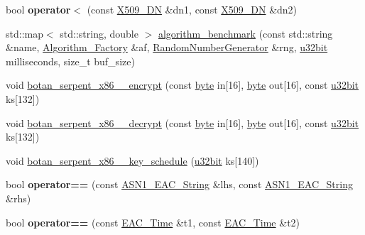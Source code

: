 \begin{DoxyCompactItemize}
\item 
\hypertarget{namespaceBotan_a2d40d6012fc27eb7e7ebbfc8e8042715}{bool {\bfseries operator$<$} (const \hyperlink{classBotan_1_1X509__DN}{X509\-\_\-\-D\-N} \&dn1, const \hyperlink{classBotan_1_1X509__DN}{X509\-\_\-\-D\-N} \&dn2)}\label{namespaceBotan_a2d40d6012fc27eb7e7ebbfc8e8042715}

\item 
std\-::map$<$ std\-::string, double $>$ \hyperlink{namespaceBotan_a69b245e0b2706539b0fae5eeedc2004c}{algorithm\-\_\-benchmark} (const std\-::string \&name, \hyperlink{classBotan_1_1Algorithm__Factory}{Algorithm\-\_\-\-Factory} \&af, \hyperlink{classBotan_1_1RandomNumberGenerator}{Random\-Number\-Generator} \&rng, \hyperlink{namespaceBotan_aacc7d03c95e97e76168fc1c819031830}{u32bit} milliseconds, size\-\_\-t buf\-\_\-size)
\item 
void \hyperlink{namespaceBotan_a9a18dadd96232f11c1782e5693862130}{botan\-\_\-serpent\-\_\-x86\-\_\-\_\-encrypt} (const \hyperlink{namespaceBotan_a7d793989d801281df48c6b19616b8b84}{byte} in\mbox{[}16\mbox{]}, \hyperlink{namespaceBotan_a7d793989d801281df48c6b19616b8b84}{byte} out\mbox{[}16\mbox{]}, const \hyperlink{namespaceBotan_aacc7d03c95e97e76168fc1c819031830}{u32bit} ks\mbox{[}132\mbox{]})
\item 
void \hyperlink{namespaceBotan_a49ae7c1229f0d0de5de1517afbd7d4ae}{botan\-\_\-serpent\-\_\-x86\-\_\-\_\-decrypt} (const \hyperlink{namespaceBotan_a7d793989d801281df48c6b19616b8b84}{byte} in\mbox{[}16\mbox{]}, \hyperlink{namespaceBotan_a7d793989d801281df48c6b19616b8b84}{byte} out\mbox{[}16\mbox{]}, const \hyperlink{namespaceBotan_aacc7d03c95e97e76168fc1c819031830}{u32bit} ks\mbox{[}132\mbox{]})
\item 
void \hyperlink{namespaceBotan_a02afffa9235dcc1785ce0d54683f1c1e}{botan\-\_\-serpent\-\_\-x86\-\_\-\_\-key\-\_\-schedule} (\hyperlink{namespaceBotan_aacc7d03c95e97e76168fc1c819031830}{u32bit} ks\mbox{[}140\mbox{]})
\item 
\hypertarget{namespaceBotan_aa8edfc1f5ecaad34e74ac038405ebe37}{bool {\bfseries operator==} (const \hyperlink{classBotan_1_1ASN1__EAC__String}{A\-S\-N1\-\_\-\-E\-A\-C\-\_\-\-String} \&lhs, const \hyperlink{classBotan_1_1ASN1__EAC__String}{A\-S\-N1\-\_\-\-E\-A\-C\-\_\-\-String} \&rhs)}\label{namespaceBotan_aa8edfc1f5ecaad34e74ac038405ebe37}

\item 
\hypertarget{namespaceBotan_a5a4e16654c6bebbb945d531eea0a8372}{bool {\bfseries operator==} (const \hyperlink{classBotan_1_1EAC__Time}{E\-A\-C\-\_\-\-Time} \&t1, const \hyperlink{classBotan_1_1EAC__Time}{E\-A\-C\-\_\-\-Time} \&t2)}\label{namespaceBotan_a5a4e16654c6bebbb945d531eea0a8372}


\end{DoxyCompactItemize}
